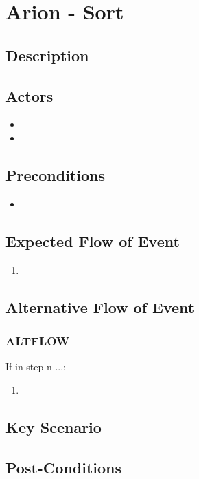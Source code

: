\documentclass{scrreprt}
\begin{document}
\chapter*{Arion - Sort}

\section*{Description}

\section*{Actors}
\begin{itemize}
    \item 
    \item 
\end{itemize}

\section*{Preconditions}
\begin{itemize}
    \item 
\end{itemize}

\section*{Expected Flow of Event}
\begin{enumerate}[1.]
    \item 
\end{enumerate}

\section*{Alternative Flow of Event}
\subsection*{ALTFLOW}
If in step n ...:
\begin{enumerate}
    \item 
\end{enumerate}

\section*{Key Scenario}

\section*{Post-Conditions}
\end{document}
